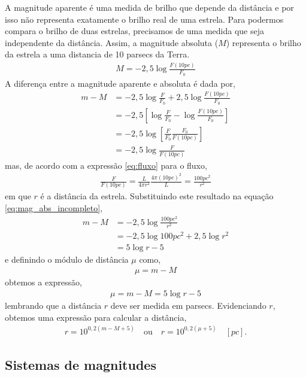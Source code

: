 A magnitude aparente é uma medida de brilho que depende da distância e por isso não representa exatamente o brilho real de uma estrela. Para podermos compara o brilho de duas estrelas, precisamos de uma medida que seja independente da distância. Assim, a magnitude absoluta ($M$) representa o brilho da estrela a uma distancia de 10 parsecs da Terra.
\begin{align}
M = -2,5 \log \frac{F(10\si{pc})}{F_0}
\end{align}
A diferença entre a magnitude aparente e absoluta é dada por,
\begin{align}
m - M &= - 2,5 \log \frac{F}{F_0} + 2,5 \log \frac{F(10\si{pc})}{F_0} \\
&= -2,5 \left[ \log \frac{F}{F_0} - \log \frac{F(10\si{pc})}{F_0} \right] \\
&= -2,5 \log \left[ \frac{F}{F_0} \frac{F_0}{F(10\si{pc})} \right] \\
&= -2,5 \log \frac{F}{F(10\si{pc})} \label{eq:mag_abs_incompleto}
\end{align}
mas, de acordo com a expressão \eqref{eq:fluxo} para o fluxo,
\begin{align}
\frac{F}{F(10\si{pc})} = \frac{L}{4\pi r^2} \frac{4\pi \left(10 \si{pc}\right)^2}{L} = \frac{100 \si{pc}^2}{r^2}
\end{align}
em que $r$ é a distância da estrela. Substituindo este resultado na equação \eqref{eq:mag_abs_incompleto},
\begin{align}
m - M &= -2,5 \log \frac{100 \si{pc}^2}{r^2} \\
&= -2,5 \log 100 \si{pc}^2 + 2,5 \log r^2 \\
&= 5 \log r - 5
\end{align}
e definindo o módulo de distância $\mu$ como,
\begin{align}
\mu = m - M
\end{align}
obtemos a expressão,
\begin{align}
\mu = m - M = 5 \log r - 5 \label{eq:modulo_distancia}
\end{align}
lembrando que a distância $r$ deve ser medida em parsecs. Evidenciando $r$, obtemos uma expressão para calcular a distância,
\begin{align}
r = 10^{0,2\left( m - M + 5 \right)} \quad \text{ou} \quad  r = 10^{0,2\left( \mu + 5 \right)} \quad \left[ \si{pc} \right].
\end{align}

\subsection{Sistemas de magnitudes}


